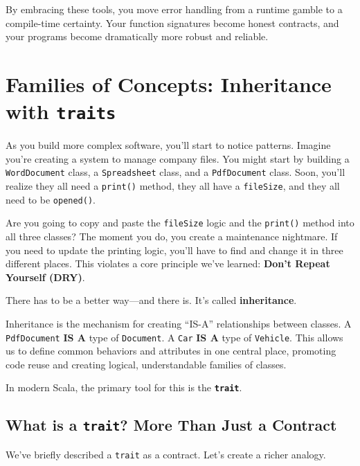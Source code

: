 \documentclass[
  letterpaper,
  DIV=11,
  numbers=noendperiod]{scrreprt}
\begin{document}
By embracing these tools, you move error handling from a runtime gamble
to a compile-time certainty. Your function signatures become honest
contracts, and your programs become dramatically more robust and
reliable.


\chapter{\texorpdfstring{Families of Concepts: Inheritance with
\texttt{traits}}{Families of Concepts: Inheritance with traits}}\label{families-of-concepts-inheritance-with-traits}

As you build more complex software, you'll start to notice patterns.
Imagine you're creating a system to manage company files. You might
start by building a \texttt{WordDocument} class, a \texttt{Spreadsheet}
class, and a \texttt{PdfDocument} class. Soon, you'll realize they all
need a \texttt{print()} method, they all have a \texttt{fileSize}, and
they all need to be \texttt{opened()}.

Are you going to copy and paste the \texttt{fileSize} logic and the
\texttt{print()} method into all three classes? The moment you do, you
create a maintenance nightmare. If you need to update the printing
logic, you'll have to find and change it in three different places. This
violates a core principle we've learned: \textbf{Don't Repeat Yourself
(DRY)}.

There has to be a better way---and there is. It's called
\textbf{inheritance}.

Inheritance is the mechanism for creating ``IS-A'' relationships between
classes. A \texttt{PdfDocument} \textbf{IS A} type of \texttt{Document}.
A \texttt{Car} \textbf{IS A} type of \texttt{Vehicle}. This allows us to
define common behaviors and attributes in one central place, promoting
code reuse and creating logical, understandable families of classes.

In modern Scala, the primary tool for this is the
\textbf{\texttt{trait}}.

\section{\texorpdfstring{What is a \texttt{trait}? More Than Just a
Contract}{What is a trait? More Than Just a Contract}}\label{what-is-a-trait-more-than-just-a-contract}

We've briefly described a \texttt{trait} as a contract. Let's create a
richer analogy.
\end{document}
